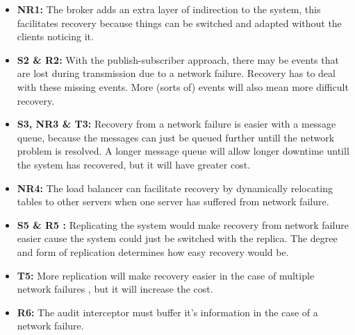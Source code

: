 \documentclass[a4paper,11pt]{report}
\begin{document}
\begin{itemize}
\item \textbf{NR1:} The broker adds an extra layer of indirection to the system, this facilitates recovery because
things can be switched and adapted without the clients noticing it.
\item \textbf{S2 \& R2:} With the publish-subscriber approach, there may be events that are lost during transmission due
to a network failure. Recovery has to deal with these missing events. More (sorts of) events will also mean
more difficult recovery.
\item \textbf{S3, NR3 \& T3:} Recovery from a network failure is easier with a message queue, because the messages can just
be queued further untill the network problem is resolved. A longer message queue will allow longer downtime untill
the system has recovered, but it will have greater cost.
\item \textbf{NR4:} The load balancer can facilitate recovery by dynamically relocating tables to other servers when
one server has suffered from network failure.
\item \textbf{S5 \& R5 :} Replicating the system would make recovery from network failure easier cause the system
could just be switched with the replica. The degree and form of replication determines how easy recovery would be.
\item \textbf{T5:} More replication will make recovery easier in the case of multiple network failures
, but it will increase the cost.
\item \textbf{R6:} The audit interceptor must buffer it's information in the case of a network failure.
\end{itemize}
\end{document}

